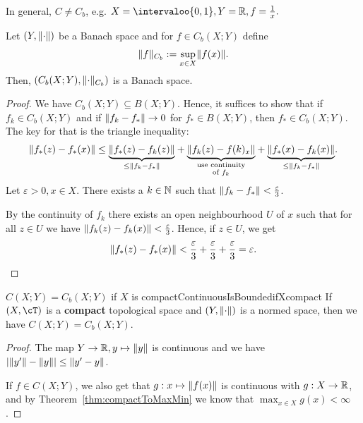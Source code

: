 \documentclass[language=english]{../../Template/TemplateLecture}
\begin{document}
In general, $C \neq C_b$, e.g. $X = \intervaloo{0,1}, Y = \IR, f = \frac{1}{x}.$

\begin{prop}
    Let $(Y, \lVert\cdot\rVert)$ be a Banach space and for $f \in C_b(X;Y)$ define 
    \begin{equation}
        \lVert f\rVert_{C_{b}} := \sup_{x \in X} \lVert f(x)\rVert.
    \end{equation}
    Then, $(C_b(X;Y), \lVert\cdot\rVert_{C_b})$ is a Banach space.
\end{prop}

\begin{proof}
    We have $C_b(X; Y) \subseteq B(X; Y)$. Hence, it suffices to show that if $f_k \in C_b(X;Y)$ and if $\lVert f_k - f_*\rVert \to 0$ for $f_* \in B(X;Y)$, then $f_* \in C_b(X;Y)$. The key for that is the triangle inequality:
    \begin{equation}
        \begin{split}
            \lVert f_*(z) - f_*(x)\rVert \leq \underset{\leq \lVert f_k - f_*\rVert}{\underbrace{\lVert f_*(z) - f_k(z)\rVert}} + \underset{\substack{\text{use continuity} \\ \text{of $f_k$}}}{\underbrace{\lVert f_k(z) - f(k)_x\rVert}} + \underset{\leq \lVert f_k - f_*\rVert}{\underbrace{\lVert f_*(x) - f_k(x)\rVert}}.
        \end{split}
    \end{equation}
    Let $\varepsilon > 0, x \in X$. There exists a $k \in \mathbb{N}$ such that $\lVert f_k - f_*\rVert < \frac{\varepsilon}{3}$.

    By the continuity of $f_k$ there exists an open neighbourhood $U$ of $x$ such that for all $z \in U$ we have $\lVert f_k(z) - f_k(x)\rVert < \frac{\varepsilon}{3}$. Hence, if $z \in U$, we get 
    \begin{equation}
        \lVert f_*(z) - f_*(x)\rVert < \frac{\varepsilon}{3} + \frac{\varepsilon}{3} + \frac{\varepsilon}{3} = \varepsilon.
    \end{equation}
\end{proof}

\begin{thm}{$C(X;Y) = C_b(X;Y)$ if $X$ is compact}{ContinuousIsBoundedifXcompact}
    If $(X,\cT)$ is a \textbf{compact} topological space and $(Y,\lVert\cdot\rVert)$ is a normed space, then we have $C(X;Y) = C_b(X;Y)$.
\end{thm}

\begin{proof}
    The map $Y \to \mathbb{R}, y \mapsto \lVert y\rVert$ is continuous and we have $\lvert\lVert y'\rVert - \lVert y\rVert\rvert \leq \lVert y' - y\rVert$.

    If $f \in C(X;Y)$, we also get that $g: x \mapsto \lVert f(x)\rVert$ is continuous with $g: X \to \mathbb{R}$, and by Theorem~\ref{thm:compactToMaxMin} we know that $\max_{x \in X} g(x) < \infty$.
\end{proof}
\end{document}
